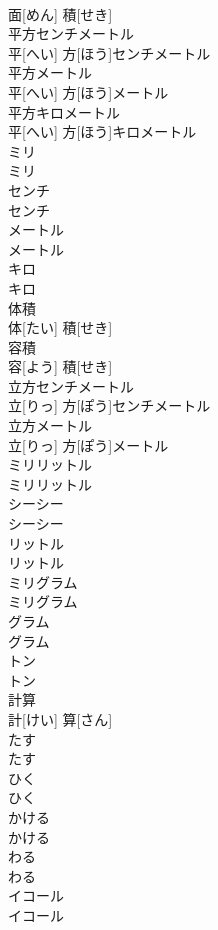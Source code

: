 \documentclass[8pt]{extreport}
\begin{document}
\begin{CJK}{UTF8}{min}
\\	面[めん] 積[せき]		
\\	平方センチメートル	
\\	平[へい] 方[ほう]センチメートル		
\\	平方メートル	
\\	平[へい] 方[ほう]メートル		
\\	平方キロメートル	
\\	平[へい] 方[ほう]キロメートル		
\\	ミリ	
\\	ミリ		
\\	センチ	
\\	センチ		
\\	メートル	
\\	メートル		
\\	キロ
\\	キロ
\\	体積	
\\	体[たい] 積[せき]		
\\	容積	
\\	容[よう] 積[せき]		
\\	立方センチメートル	
\\	立[りっ] 方[ぽう]センチメートル		
\\	立方メートル	
\\	立[りっ] 方[ぽう]メートル		
\\	ミリリットル	
\\	ミリリットル		
\\	シーシー	
\\	シーシー		
\\	リットル	
\\	リットル		
\\	ミリグラム	
\\	ミリグラム		
\\	グラム	
\\	グラム		
\\	トン	
\\	トン		
\\	計算	
\\	計[けい] 算[さん]		
\\	たす	
\\	たす		
\\	ひく	
\\	ひく		
\\	かける	
\\	かける		
\\	わる	
\\	わる		
\\	イコール	
\\	イコール		

\end{CJK}
\end{document}
